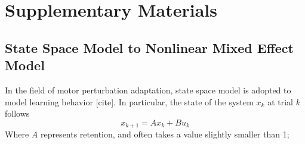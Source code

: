 \section{Supplementary Materials}
\subsection{State Space Model to Nonlinear Mixed Effect Model}\label{sec:SM1}
In the field of motor perturbation adaptation, state space model is adopted to model learning behavior [cite]. 
In particular, the state of the system $ x_k $ at trial $ k $ follows 
\begin{equation}\label{ssm}
x_{k+1} = Ax_k + Bu_k
\end{equation}
Where $ A $ represents retention, and often takes a value slightly smaller than 1; 
